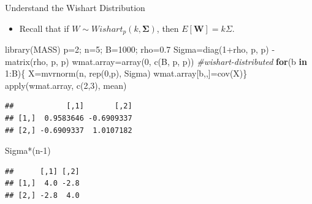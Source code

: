 \documentclass[
  ignorenonframetext,
]{beamer}
\newenvironment{Shaded}{\begin{snugshade}}{\end{snugshade}}
\newcommand{\CommentTok}[1]{\textcolor[rgb]{0.56,0.35,0.01}{\textit{#1}}}
\newcommand{\ControlFlowTok}[1]{\textcolor[rgb]{0.13,0.29,0.53}{\textbf{#1}}}
\newcommand{\DecValTok}[1]{\textcolor[rgb]{0.00,0.00,0.81}{#1}}
\newcommand{\FloatTok}[1]{\textcolor[rgb]{0.00,0.00,0.81}{#1}}
\newcommand{\FunctionTok}[1]{\textcolor[rgb]{0.00,0.00,0.00}{#1}}
\newcommand{\NormalTok}[1]{#1}
\newcommand{\OtherTok}[1]{\textcolor[rgb]{0.56,0.35,0.01}{#1}}
\newcommand{\SpecialCharTok}[1]{\textcolor[rgb]{0.00,0.00,0.00}{#1}}
\providecommand{\tightlist}{%
  \setlength{\itemsep}{0pt}\setlength{\parskip}{0pt}}
\begin{document}
\begin{frame}[fragile]{Understand the Wishart Distribution}
\protect\hypertarget{understand-the-wishart-distribution}{}
\begin{itemize}
\tightlist
\item
  Recall that if \(W\sim Wishart_p(k, \boldsymbol \Sigma)\), then
  \(E[\mathbf W]=k\Sigma\).
\end{itemize}

\tiny

\begin{Shaded}
\begin{Highlighting}[]
\FunctionTok{library}\NormalTok{(MASS)}
\NormalTok{p}\OtherTok{=}\DecValTok{2}\NormalTok{; n}\OtherTok{=}\DecValTok{5}\NormalTok{; B}\OtherTok{=}\DecValTok{1000}\NormalTok{; rho}\OtherTok{=}\FloatTok{0.7}
\NormalTok{Sigma}\OtherTok{=}\FunctionTok{diag}\NormalTok{(}\DecValTok{1}\SpecialCharTok{+}\NormalTok{rho, p, p) }\SpecialCharTok{{-}} \FunctionTok{matrix}\NormalTok{(rho, p, p)}
\NormalTok{wmat.array}\OtherTok{=}\FunctionTok{array}\NormalTok{(}\DecValTok{0}\NormalTok{, }\FunctionTok{c}\NormalTok{(B, p, p)) }\CommentTok{\#wishart{-}distributed}
\ControlFlowTok{for}\NormalTok{(b }\ControlFlowTok{in} \DecValTok{1}\SpecialCharTok{:}\NormalTok{B)\{}
\NormalTok{  X}\OtherTok{=}\FunctionTok{mvrnorm}\NormalTok{(n, }\FunctionTok{rep}\NormalTok{(}\DecValTok{0}\NormalTok{,p), Sigma)}
\NormalTok{  wmat.array[b,,]}\OtherTok{=}\FunctionTok{cov}\NormalTok{(X)\}}
\FunctionTok{apply}\NormalTok{(wmat.array, }\FunctionTok{c}\NormalTok{(}\DecValTok{2}\NormalTok{,}\DecValTok{3}\NormalTok{), mean)}
\end{Highlighting}
\end{Shaded}

\begin{verbatim}
##            [,1]       [,2]
## [1,]  0.9583646 -0.6909337
## [2,] -0.6909337  1.0107182
\end{verbatim}

\begin{Shaded}
\begin{Highlighting}[]
\NormalTok{Sigma}\SpecialCharTok{*}\NormalTok{(n}\DecValTok{{-}1}\NormalTok{)}
\end{Highlighting}
\end{Shaded}

\begin{verbatim}
##      [,1] [,2]
## [1,]  4.0 -2.8
## [2,] -2.8  4.0
\end{verbatim}

\normalsize
\end{frame}
\end{document}
